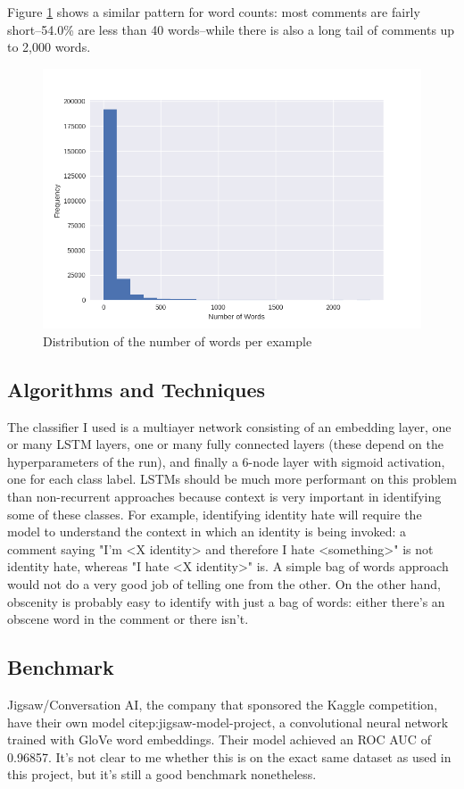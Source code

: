 \documentclass[12pt]{article}
\begin{document}
Figure \ref{fig:word-dist} shows a similar pattern for word counts: most comments are fairly short--54.0\% are less than 40 words--while there is also a long tail of comments up to 2,000 words.
\begin{figure}
\centering
\includegraphics[width=\textwidth]{word_counts}
\caption{Distribution of the number of words per example}
\label{fig:word-dist}
\end{figure}


\subsection*{Algorithms and Techniques}
\label{sec:org8a607b3}
The classifier I used is a multiayer network consisting of an embedding layer, one or many LSTM layers, one or many fully connected layers (these depend on the hyperparameters of the run), and finally a 6-node layer with sigmoid activation, one for each class label. LSTMs should be much more performant on this problem than non-recurrent approaches because context is very important in identifying some of these classes. For example, identifying identity hate will require the model to understand the context in which an identity is being invoked: a comment saying "I'm <X identity> and therefore I hate <something>" is not identity hate, whereas "I hate <X identity>" is. A simple bag of words approach would not do a very good job of telling one from the other. On the other hand, obscenity is probably easy to identify with just a bag of words: either there's an obscene word in the comment or there isn't.

\subsection*{Benchmark}
\label{sec:orgf01c076}
Jigsaw/Conversation AI, the company that sponsored the Kaggle competition, have their own model citep:jigsaw-model-project, a convolutional neural network trained with GloVe word embeddings. Their model achieved an ROC AUC of 0.96857. It's not clear to me whether this is on the exact same dataset as used in this project, but it's still a good benchmark nonetheless.
\end{document}
